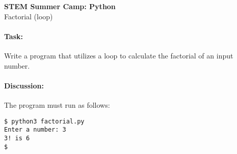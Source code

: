 \documentclass[11pt]{article}
\begin{document}
    \begin{center}

        \large\textbf{STEM Summer Camp: Python} \\
        Factorial (loop) \\

    \end{center}

    \paragraph{Task:} Write a program that utilizes a loop to calculate
    the factorial of an input number.  
    
    \paragraph{Discussion:} The program must run as follows:
    
    \vspace{1.5em}

\begin{verbatim}
$ python3 factorial.py
Enter a number: 3
3! is 6
$
\end{verbatim}
    
\end{document}
